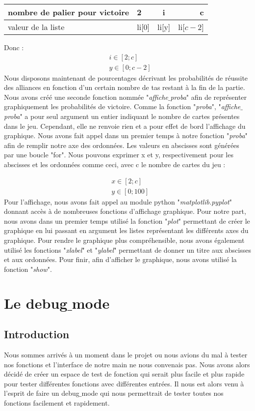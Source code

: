 \documentclass[10pt,a4paper,french,titlepage]{article}
\theoremstyle{definition}
\begin{document}
\begin{center}
\begin{tabular}{|p{3cm}|l|c|r|}
  \hline
  nombre de palier pour victoire & 2 & i & c\\
  \hline
  valeur de la liste & li[0] & li[y] & li[$c-2$] \\
  \hline
\end{tabular}
\end{center}
Donc :
\begin{align*}
&i \in [2;c]\\
&y \in [0;c-2]
\end{align*}
Nous disposons maintenant de pourcentages décrivant les probabilités de réussite des alliances en fonction d'un certain nombre de tas restant à la fin de la partie. Nous avons créé une seconde fonction nommée "\textit{affiche$\_$proba}" afin de représenter graphiquement les probabilités de victoire. Comme la fonction "\textit{proba}", "\textit{affiche$\_$proba}" a pour seul argument un entier indiquant le nombre de cartes présentes dans le jeu. Cependant, elle ne renvoie rien et a pour effet de bord l'affichage du graphique. Nous avons fait appel dans un premier temps à notre fonction "\textit{proba}" afin de remplir notre axe des ordonnées. Les valeurs en abscisses sont générées par une boucle
"for". Nous pouvons exprimer x et y, respectivement pour les abscisses et les ordonnées comme ceci, avec c le nombre de cartes du jeu :

\begin{align*}
&x \in [2;c] \\
&y \in [0;100]
\end{align*}
Pour l'affichage, nous avons fait appel au module python "\textit{matplotlib.pyplot}" donnant accès à de nombreuses fonctions d'affichage graphique. Pour notre part, nous avons dans un premier temps utilisé la fonction "\textit{plot}" permettant de créer le graphique en lui passant en argument les listes représentant les différents axes du graphique. Pour rendre le graphique plus compréhensible, nous avons également utilisé les fonctions "\textit{xlabel}" et "\textit{ylabel}" permettant de donner un titre aux abscisses et aux ordonnées. Pour finir, afin d'afficher le graphique, nous avons utilisé la fonction "\textit{show}".

\section{Le debug$\_$mode}
\subsection{Introduction}
Nous sommes arrivés à un moment dans le projet ou nous avions du mal à tester nos fonctions et l’interface de notre main ne nous convenais pas. Nous avons alors décidé de créer un espace de test de fonction qui serait plus facile et plus rapide pour tester différentes fonctions avec différentes entrées. Il nous est alors venu à l’esprit de faire un debug$\_$mode qui nous permettrait de tester toutes nos fonctions facilement et rapidement.
\end{document}
